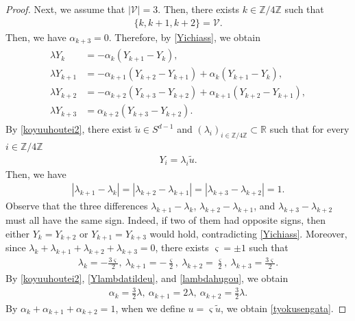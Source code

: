 \documentclass[reqno]{amsart}
\theoremstyle{plain}
\theoremstyle{definition}
\numberwithin{equation}{section}
\begin{document}
\begin{proof}
Next, we assume that $|\mathcal{V}|=3$. Then, there exists $k\in\mathbb{Z}/4\mathbb{Z}$ such that 
\begin{align*}
\{k,k+1,k+2\}=\mathcal{V}.
\end{align*}
Then, we have $\alpha_{k+3}=0$. Therefore, by \eqref{Yichiass}, we obtain
\begin{align}\label{koyuuhoutei2}
\begin{aligned}
\lambda Y_k&=-\alpha_k\left(Y_{k+1}-Y_k\right),
\\
\lambda Y_{k+1}&=-\alpha_{k+1}\left(Y_{k+2}-Y_{k+1}\right)+\alpha_k\left(Y_{k+1}-Y_k\right),
\\
\lambda Y_{k+2}&=-\alpha_{k+2}\left(Y_{k+3}-Y_{k+2}\right)+\alpha_{k+1}\left(Y_{k+2}-Y_{k+1}\right),
\\
\lambda Y_{k+3}&=\alpha_{k+2}\left(Y_{k+3}-Y_{k+2}\right).
\end{aligned}
\end{align}
By \eqref{koyuuhoutei2}, there exist $\tilde{u}\in S^{d-1}$ and $(\lambda_i)_{i\in\mathbb{Z}/4\mathbb{Z}}\subset \mathbb{R}$ such that for every $i\in\mathbb{Z}/4\mathbb{Z}$
\begin{align}\label{Ylambdatildeu}
Y_i=\lambda_i \tilde{u}. 
\end{align}
Then, we have
\begin{align*}
\left|\lambda_{k+1}-\lambda_k\right|=\left|\lambda_{k+2}-\lambda_{k+1}\right|=\left|\lambda_{k+3}-\lambda_{k+2}\right|=1.
\end{align*}
Observe that the three differences $\lambda_{k+1}-\lambda_k$, $\lambda_{k+2}-\lambda_{k+1}$, and $\lambda_{k+3}-\lambda_{k+2}$ must all have the same sign. Indeed, if two of them had opposite signs, then either
$Y_k=Y_{k+2}$ or $Y_{k+1}=Y_{k+3}$ would hold, contradicting \eqref{Yichiass}. Moreover, since $\lambda_k+\lambda_{k+1}+\lambda_{k+2}+\lambda_{k+3}=0$, there exists $\varsigma=\pm 1$ such that
\begin{align}\label{lambdahugou}
\lambda_k=-\frac{3\varsigma}{2},\ \lambda_{k+1}=-\frac{\varsigma}{2},\ \lambda_{k+2}=\frac{\varsigma}{2},\ \lambda_{k+3}=\frac{3\varsigma}{2}. 
\end{align}
By \eqref{koyuuhoutei2}, \eqref{Ylambdatildeu}, and \eqref{lambdahugou}, we obtain
\begin{align*}
\alpha_k=\frac{3}{2}\lambda,\ \alpha_{k+1}=2\lambda,\ \alpha_{k+2}=\frac{3}{2}\lambda.
\end{align*}
By $\alpha_k+\alpha_{k+1}+\alpha_{k+2}=1$, when we define $u=\varsigma \tilde{u}$, we obtain \eqref{tyokusengata}.


\end{proof}
\end{document}
